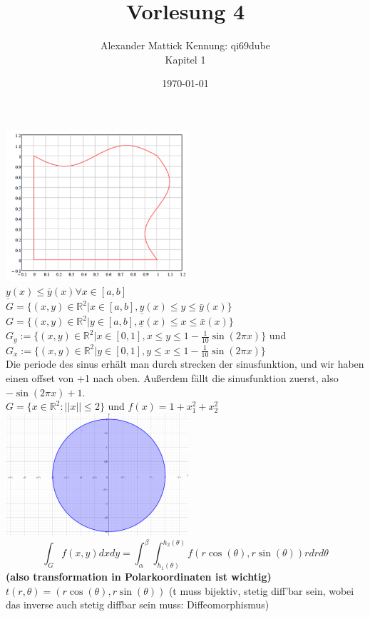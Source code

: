 \documentclass{article}
\author{
Alexander Mattick Kennung: qi69dube\\
Kapitel 1
}
\date{\today}
\title{Vorlesung 4}
\begin{document}
	\maketitle
	\includegraphics[width=256px]{Menge.png}\\
	$\underline{y}(x)\leq \bar y(x) \forall x\in [a,b]$\\
	$G=\{(x,y)\in\mathbb{R}^2|x\in[a,b], \underline{y}(x)\leq y\leq \bar y(x)\}$\\
	$G=\{(x,y)\in\mathbb{R}^2|y\in[a,b], \underline{x}(x)\leq x\leq \bar x(x)\}$\\
	$G_y:=\{(x,y)\in\mathbb{R}^2|x\in[0,1],x\leq y\leq 1-\frac{1}{10}\sin(2\pi x)\}$
	und\\
	$G_x:=\{(x,y)\in\mathbb{R}^2| y\in[0,1], y\leq x\leq 1-\frac{1}{10}\sin(2\pi x)\}$\\
	Die periode des sinus erhält man durch strecken der sinusfunktion, und wir haben einen offset von +1 nach oben. Außerdem fällt die sinusfunktion zuerst, also $-\sin(2\pi x)+1$.\\
	$G=\{x\in\mathbb{R}^2: ||x||\leq 2\}$ und $f(x)=1+x_1^2+x_2^2$\\
	\includegraphics[width=256px]{KreisG.png}\\
	$$\int_G f(x,y)dxdy = \int_\alpha^\beta \int^{h_2(\theta)}_{h_1(\theta)} f(r\cos(\theta),r\sin(\theta))rdrd\theta$$
	\textbf{(also transformation in Polarkoordinaten ist wichtig)\\}
	$t(r,\theta)= (r\cos(\theta),r\sin(\theta))$ (t muss bijektiv, stetig diff'bar sein, wobei das inverse auch stetig diffbar sein muss: Diffeomorphismus)\\
\end{document}
